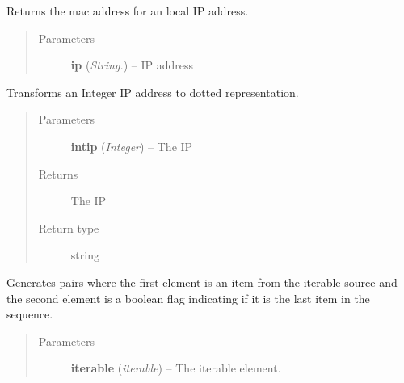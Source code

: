 \documentclass[letterpaper,10pt,english]{sphinxmanual}
\begin{document}

\begin{fulllineitems}
\label{api:utils.GetMacForIp}
Returns the mac address for an local IP address.
\begin{quote}\begin{description}
\item[{Parameters}] \leavevmode
\textbf{ip} (\emph{String.}) -- IP address

\end{description}\end{quote}

\end{fulllineitems}


\begin{fulllineitems}
\label{api:utils.IntToDottedIP}
Transforms an Integer IP address to dotted representation.
\begin{quote}\begin{description}
\item[{Parameters}] \leavevmode
\textbf{intip} (\emph{Integer}) -- The IP

\item[{Returns}] \leavevmode
The IP

\item[{Return type}] \leavevmode
string

\end{description}\end{quote}

\end{fulllineitems}


\begin{fulllineitems}
\label{api:utils.IterIsLast}
Generates pairs where the first element is an item from the iterable
source and the second element is a boolean flag indicating if it is the
last item in the sequence.
\begin{quote}\begin{description}
\item[{Parameters}] \leavevmode
\textbf{iterable} (\emph{iterable}) -- The iterable element.

\end{description}\end{quote}

\end{fulllineitems}
\end{document}
